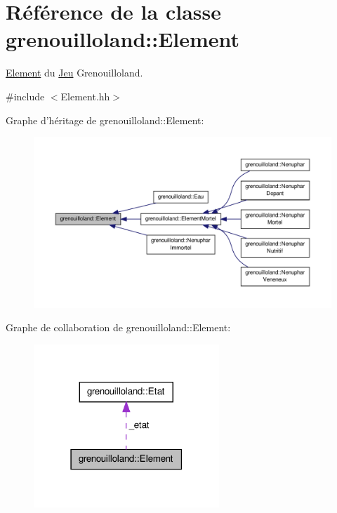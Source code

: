 \hypertarget{classgrenouilloland_1_1Element}{\section{Référence de la classe grenouilloland\-:\-:Element}
\label{classgrenouilloland_1_1Element}
}


\hyperlink{classgrenouilloland_1_1Element}{Element} du \hyperlink{classgrenouilloland_1_1Jeu}{Jeu} Grenouilloland.  




{\ttfamily \#include $<$Element.\-hh$>$}



Graphe d'héritage de grenouilloland\-:\-:Element\-:
\nopagebreak
\begin{figure}[H]
\begin{center}
\leavevmode
\includegraphics[width=350pt]{classgrenouilloland_1_1Element__inherit__graph}
\end{center}
\end{figure}


Graphe de collaboration de grenouilloland\-:\-:Element\-:
\nopagebreak
\begin{figure}[H]
\begin{center}
\leavevmode
\includegraphics[width=198pt]{classgrenouilloland_1_1Element__coll__graph}
\end{center}
\end{figure}
